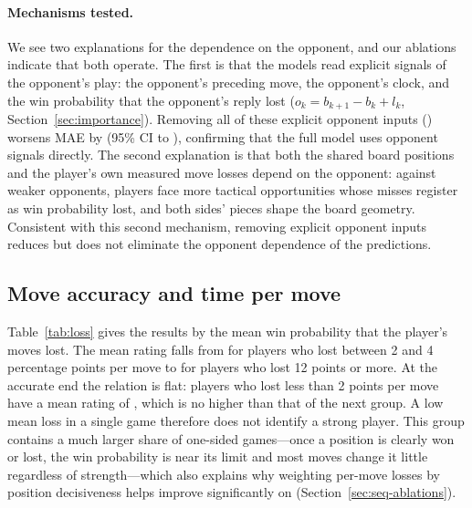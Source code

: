 \documentclass[11pt]{article}
\begin{document}
\paragraph{Mechanisms tested.}
We see two explanations for the dependence on the opponent, and our ablations
indicate that both operate. The first is that the models read explicit
signals of the opponent's play: the opponent's preceding move, the opponent's
clock, and the win probability that the opponent's reply lost
($o_k = b_{k+1} - b_k + l_k$, Section~\ref{sec:importance}). Removing all of
these explicit opponent inputs () worsens MAE by
 (95\% CI
 to
), confirming that the full
model uses opponent signals directly. The second explanation is that both
the shared board positions and the player's own measured move losses depend
on the opponent: against weaker opponents, players face more tactical
opportunities whose misses register as win probability lost, and both sides'
pieces shape the board geometry. Consistent with this second mechanism,
removing explicit opponent inputs reduces but does not eliminate the
opponent dependence of the predictions.

\subsection{Move accuracy and time per move}
\label{sec:accuracy}

Table~\ref{tab:loss} gives the results by the mean win probability that the
player's moves lost. The mean rating falls from 
for players who lost between 2 and 4 percentage points per move to
 for players who lost 12 points or more. At the
accurate end the relation is flat: players who lost less than 2 points per
move have a mean rating of , which is no higher
than that of the next group. A low mean loss in a single game therefore does
not identify a strong player. This group contains a much larger share of
one-sided games---once a position is clearly won or lost, the win
probability is near its limit and most moves change it little regardless of
strength---which also explains why weighting per-move losses by position
decisiveness helps  improve significantly on
 (Section~\ref{sec:seq-ablations}).

\begin{table}[htbp]\centering\footnotesize
{}
\caption{Test-set results by the mean win probability lost per move, in
percentage points. For each group: the number of test examples, the mean
rating, the mean prediction and MAE of each of the two models, and the paired
gain of the first model over the second.}
\label{tab:loss}
\end{table}
\end{document}
